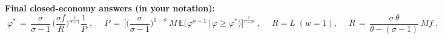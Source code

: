 \begin{solution}
    
    \bigskip
    	\textbf{Final closed-economy answers (in your notation):}
    \[
    \boxed{\;\displaystyle \varphi^* \,=\, \frac{\sigma}{\sigma-1}\,\Big(\frac{\sigma f}{R}\Big)^{\!\frac{1}{\sigma-1}} \frac{1}{P}\; },
    \quad
    \boxed{\;\displaystyle P \,=\, \Big[\Big(\frac{\sigma}{\sigma-1}\Big)^{1-\sigma}\, M\, \mathbb{E}\big(\varphi^{\sigma-1}\,\big|\,\varphi\ge \varphi^*\big)\Big]^{\!\tfrac{1}{1-\sigma}}\; },
    \quad
    \boxed{\; R = L\; (w=1) },\quad \boxed{\; R \,=\, \dfrac{\sigma\,\theta}{\theta-(\sigma-1)}\, M f\; }.
    \]
\end{solution}